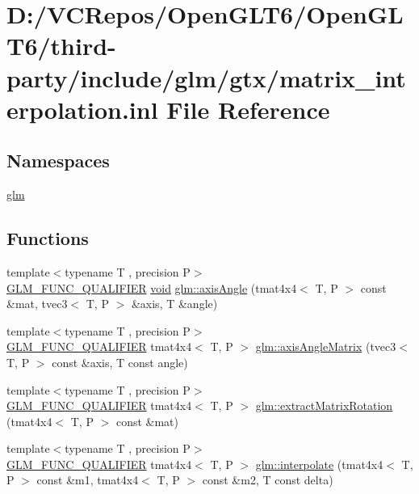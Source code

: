 \hypertarget{matrix__interpolation_8inl}{}\section{D\+:/\+V\+C\+Repos/\+Open\+G\+L\+T6/\+Open\+G\+L\+T6/third-\/party/include/glm/gtx/matrix\+\_\+interpolation.inl File Reference}
\label{matrix__interpolation_8inl}
\subsection*{Namespaces}
\begin{DoxyCompactItemize}
\item 
 \mbox{\hyperlink{namespaceglm}{glm}}
\end{DoxyCompactItemize}
\subsection*{Functions}
\begin{DoxyCompactItemize}
\item 
{\footnotesize template$<$typename T , precision P$>$ }\\\mbox{\hyperlink{setup_8hpp_a33fdea6f91c5f834105f7415e2a64407}{G\+L\+M\+\_\+\+F\+U\+N\+C\+\_\+\+Q\+U\+A\+L\+I\+F\+I\+ER}} \mbox{\hyperlink{glad_8h_a950fc91edb4504f62f1c577bf4727c29}{void}} \mbox{\hyperlink{group__gtx__matrix__interpolation_ga9aef292eb5f29bdbb58a53ef4281af92}{glm\+::axis\+Angle}} (tmat4x4$<$ T, P $>$ const \&mat, tvec3$<$ T, P $>$ \&axis, T \&angle)
\item 
{\footnotesize template$<$typename T , precision P$>$ }\\\mbox{\hyperlink{setup_8hpp_a33fdea6f91c5f834105f7415e2a64407}{G\+L\+M\+\_\+\+F\+U\+N\+C\+\_\+\+Q\+U\+A\+L\+I\+F\+I\+ER}} tmat4x4$<$ T, P $>$ \mbox{\hyperlink{group__gtx__matrix__interpolation_ga82d4bc058e9628cb2ea1d4e117a0cf39}{glm\+::axis\+Angle\+Matrix}} (tvec3$<$ T, P $>$ const \&axis, T const angle)
\item 
{\footnotesize template$<$typename T , precision P$>$ }\\\mbox{\hyperlink{setup_8hpp_a33fdea6f91c5f834105f7415e2a64407}{G\+L\+M\+\_\+\+F\+U\+N\+C\+\_\+\+Q\+U\+A\+L\+I\+F\+I\+ER}} tmat4x4$<$ T, P $>$ \mbox{\hyperlink{group__gtx__matrix__interpolation_ga6b8170aa4cf43caf81400696ebb38afe}{glm\+::extract\+Matrix\+Rotation}} (tmat4x4$<$ T, P $>$ const \&mat)
\item 
{\footnotesize template$<$typename T , precision P$>$ }\\\mbox{\hyperlink{setup_8hpp_a33fdea6f91c5f834105f7415e2a64407}{G\+L\+M\+\_\+\+F\+U\+N\+C\+\_\+\+Q\+U\+A\+L\+I\+F\+I\+ER}} tmat4x4$<$ T, P $>$ \mbox{\hyperlink{group__gtx__matrix__interpolation_ga45099a92c5c704503565619ac2bcd5c6}{glm\+::interpolate}} (tmat4x4$<$ T, P $>$ const \&m1, tmat4x4$<$ T, P $>$ const \&m2, T const delta)
\end{DoxyCompactItemize}
